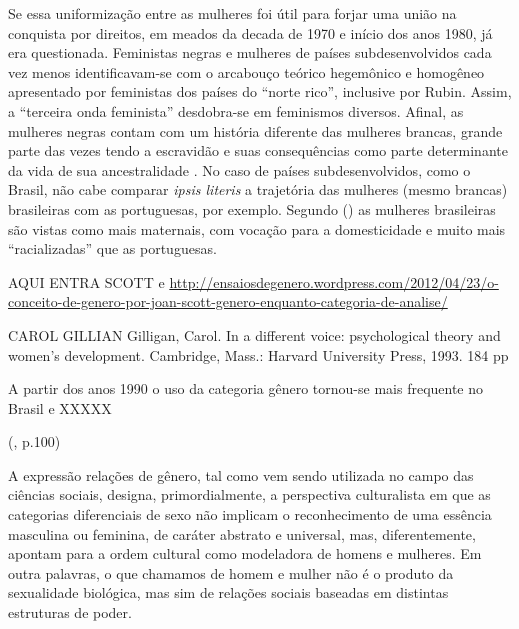 Se essa uniformização entre as mulheres foi útil para forjar uma união na conquista por direitos, em meados da decada de 1970 e início dos anos 1980, já era questionada. Feministas negras e mulheres de países subdesenvolvidos \cite{FURTADO2009} cada vez menos identificavam-se com o arcabouço teórico hegemônico e homogêneo apresentado por feministas dos países do ``norte rico'', inclusive por Rubin. Assim, a ``terceira onda feminista'' desdobra-se em feminismos diversos. Afinal, as mulheres negras contam com um história diferente das mulheres brancas, grande parte das vezes tendo a escravidão e suas consequências como parte determinante da vida de sua ancestralidade \cite{HOOKS1990}. No caso de países subdesenvolvidos, como o Brasil, não cabe comparar \emph{ipsis literis} a trajetória das mulheres (mesmo brancas) brasileiras com as portuguesas, por exemplo. Segundo  (\citeyear{PINTO2004}) as mulheres brasileiras são vistas como mais maternais, com vocação para a domesticidade e muito mais ``racializadas'' que as portuguesas.


AQUI ENTRA SCOTT e 
\url{http://ensaiosdegenero.wordpress.com/2012/04/23/o-conceito-de-genero-por-joan-scott-genero-enquanto-categoria-de-analise/}

CAROL GILLIAN
Gilligan, Carol. In a different voice: psychological theory and women's development. Cambridge, Mass.: Harvard University Press, 1993. 184 pp

A partir dos anos 1990 o uso da categoria gênero tornou-se mais frequente no Brasil \cite{MORAES1998} e XXXXX

(\citeyear{MORAES1998}, p.100)
\begin{citacao}
A expressão relações de gênero, tal como vem sendo utilizada no campo das ciências sociais, designa, primordialmente, a perspectiva culturalista em que as categorias diferenciais de sexo não implicam o reconhecimento de uma essência masculina ou feminina, de caráter abstrato e universal, mas, diferentemente, apontam para a ordem cultural como modeladora de homens e mulheres. Em outra palavras, o que chamamos de homem e mulher não é o produto da sexualidade biológica, mas sim de relações sociais baseadas em distintas estruturas de poder.
\end{citacao}

